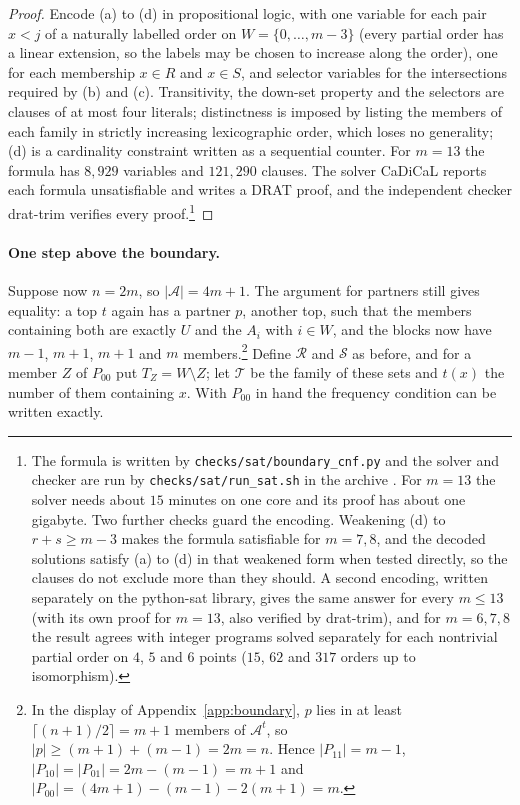 \documentclass[12pt]{article}
\theoremstyle{plain}
\newcommand{\cA}{\mathcal{A}}
\begin{document}
\begin{proof}
Encode (a) to (d) in propositional logic, with one variable for each pair $x<j$ of a naturally labelled order on $W=\{0,\dots,m-3\}$ (every partial order has a linear extension, so the labels may be chosen to increase along the order), one for each membership $x\in R$ and $x\in S$, and selector variables for the intersections required by (b) and (c). Transitivity, the down-set property and the selectors are clauses of at most four literals; distinctness is imposed by listing the members of each family in strictly increasing lexicographic order, which loses no generality; (d) is a cardinality constraint written as a sequential counter. For $m=13$ the formula has $8{,}929$ variables and $121{,}290$ clauses. The solver CaDiCaL reports each formula unsatisfiable and writes a DRAT proof, and the independent checker drat-trim verifies every proof.\footnote{The formula is written by \texttt{checks/sat/boundary\_cnf.py} and the solver and checker are run by \texttt{checks/sat/run\_sat.sh} in the archive \cite{BB26z}. For $m=13$ the solver needs about $15$ minutes on one core and its proof has about one gigabyte. Two further checks guard the encoding. Weakening (d) to $r+s\ge m-3$ makes the formula satisfiable for $m=7,8$, and the decoded solutions satisfy (a) to (d) in that weakened form when tested directly, so the clauses do not exclude more than they should. A second encoding, written separately on the python-sat library, gives the same answer for every $m\le13$ (with its own proof for $m=13$, also verified by drat-trim), and for $m=6,7,8$ the result agrees with integer programs solved separately for each nontrivial partial order on $4$, $5$ and $6$ points ($15$, $62$ and $317$ orders up to isomorphism).}
\end{proof}

\paragraph*{One step above the boundary.} Suppose now $n=2m$, so $|\cA|=4m+1$. The argument for partners still gives equality: a top $t$ again has a partner $p$, another top, such that the members containing both are exactly $U$ and the $A_i$ with $i\in W$, and the blocks now have $m-1$, $m+1$, $m+1$ and $m$ members.\footnote{In the display of Appendix~\ref{app:boundary}, $p$ lies in at least $\lceil (n+1)/2\rceil=m+1$ members of $\cA^t$, so $|p|\ge(m+1)+(m-1)=2m=n$. Hence $|P_{11}|=m-1$, $|P_{10}|=|P_{01}|=2m-(m-1)=m+1$ and $|P_{00}|=(4m+1)-(m-1)-2(m+1)=m$.} Define $\mathcal R$ and $\mathcal S$ as before, and for a member $Z$ of $P_{00}$ put $T_Z=W\setminus Z$; let $\mathcal T$ be the family of these sets and $t(x)$ the number of them containing $x$. With $P_{00}$ in hand the frequency condition can be written exactly.
\end{document}
